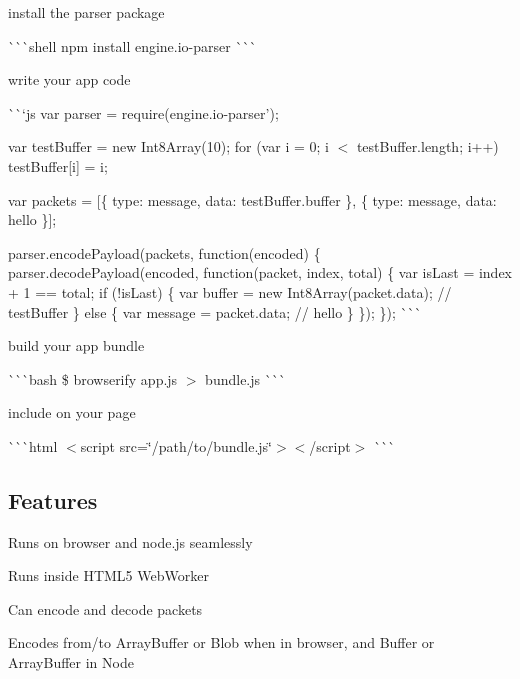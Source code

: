 \begin{DoxyEnumerate}
\item install the parser package

\`{}\`{}\`{}shell npm install engine.\+io-\/parser \`{}\`{}\`{}
\end{DoxyEnumerate}
\begin{DoxyEnumerate}
\item write your app code

\`{}\`{}`js var parser = require(\textquotesingle{}engine.\+io-\/parser');

var test\+Buffer = new Int8\+Array(10); for (var i = 0; i $<$ test\+Buffer.\+length; i++) test\+Buffer\mbox{[}i\mbox{]} = i;

var packets = \mbox{[}\{ type\+: \textquotesingle{}message\textquotesingle{}, data\+: test\+Buffer.\+buffer \}, \{ type\+: \textquotesingle{}message\textquotesingle{}, data\+: \textquotesingle{}hello\textquotesingle{} \}\mbox{]};

parser.\+encode\+Payload(packets, function(encoded) \{ parser.\+decode\+Payload(encoded, function(packet, index, total) \{ var is\+Last = index + 1 == total; if (!is\+Last) \{ var buffer = new Int8\+Array(packet.\+data); // test\+Buffer \} else \{ var message = packet.\+data; // \textquotesingle{}hello\textquotesingle{} \} \}); \}); \`{}\`{}\`{}
\end{DoxyEnumerate}
\begin{DoxyEnumerate}
\item build your app bundle

\`{}\`{}\`{}bash \$ browserify app.\+js $>$ bundle.\+js \`{}\`{}\`{}
\end{DoxyEnumerate}
\begin{DoxyEnumerate}
\item include on your page

\`{}\`{}\`{}html $<$script src=\char`\"{}/path/to/bundle.\+js\char`\"{}$>$$<$/script$>$ \`{}\`{}\`{}
\end{DoxyEnumerate}

\subsection*{Features}


\begin{DoxyItemize}
\item Runs on browser and node.\+js seamlessly
\item Runs inside H\+T\+M\+L5 Web\+Worker
\item Can encode and decode packets
\begin{DoxyItemize}
\item Encodes from/to Array\+Buffer or Blob when in browser, and Buffer or Array\+Buffer in Node
\end{DoxyItemize}
\end{DoxyItemize}

